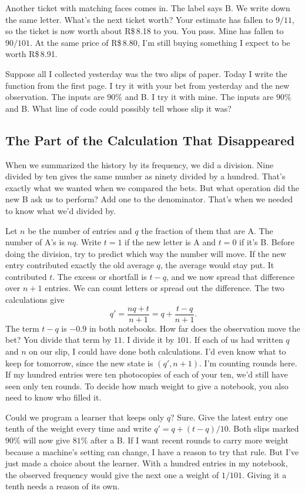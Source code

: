 \documentclass[12pt,oneside]{article}
\newcommand{\secao}[1]{\Needspace{5.2\baselineskip}\subsection*{#1}}
\begin{document}
Another ticket with matching faces comes in. The label says B. We write down the same letter. What's the next ticket worth? Your estimate has fallen to $9/11$, so the ticket is now worth about R\$\,8.18 to you. You pass. Mine has fallen to $90/101$. At the same price of R\$\,8.80, I'm still buying something I expect to be worth R\$\,8.91.

Suppose all I collected yesterday was the two slips of paper. Today I write the function from the first page. I try it with your bet from yesterday and the new observation. The inputs are $90\%$ and B. I try it with mine. The inputs are $90\%$ and B. What line of code could possibly tell whose slip it was?

\secao{The Part of the Calculation That Disappeared}
When we summarized the history by its frequency, we did a division. Nine divided by ten gives the same number as ninety divided by a hundred. That's exactly what we wanted when we compared the bets. But what operation did the new B ask us to perform? Add one to the denominator. That's when we needed to know what we'd divided by.

Let $n$ be the number of entries and $q$ the fraction of them that are A. The number of A's is $nq$. Write $t=1$ if the new letter is A and $t=0$ if it's B. Before doing the division, try to predict which way the number will move. If the new entry contributed exactly the old average $q$, the average would stay put. It contributed $t$. The excess or shortfall is $t-q$, and we now spread that difference over $n+1$ entries. We can count letters or spread out the difference. The two calculations give
\[
 q'=\frac{nq+t}{n+1}
    =q+\frac{t-q}{n+1}.
\]
The term $t-q$ is $-0.9$ in both notebooks. How far does the observation move the bet? You divide that term by $11$. I divide it by $101$. If each of us had written $q$ and $n$ on our slip, I could have done both calculations. I'd even know what to keep for tomorrow, since the new state is $(q',n+1)$. I'm counting rounds here. If my hundred entries were ten photocopies of each of your ten, we'd still have seen only ten rounds. To decide how much weight to give a notebook, you also need to know who filled it.

Could we program a learner that keeps only $q$? Sure. Give the latest entry one tenth of the weight every time and write $q'=q+(t-q)/10$. Both slips marked $90\%$ will now give $81\%$ after a B. If I want recent rounds to carry more weight because a machine's setting can change, I have a reason to try that rule. But I've just made a choice about the learner. With a hundred entries in my notebook, the observed frequency would give the next one a weight of $1/101$. Giving it a tenth needs a reason of its own.
\end{document}
